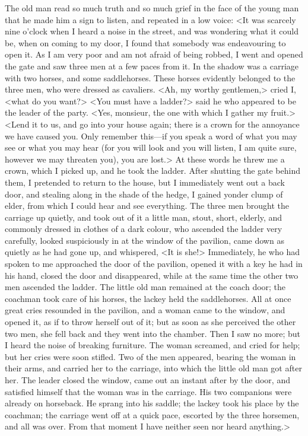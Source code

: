 The old man read so much truth and so much grief in the face of the young man that he made him a sign to listen, and repeated in a low voice: <It was scarcely nine o'clock when I heard a noise in the street, and was wondering what it could be, when on coming to my door, I found that somebody was endeavouring to open it. As I am very poor and am not afraid of being robbed, I went and opened the gate and saw three men at a few paces from it. In the shadow was a carriage with two horses, and some saddlehorses. These horses evidently belonged to the three men, who were dressed as cavaliers. <Ah, my worthy gentlemen,> cried I, <what do you want?> <You must have a ladder?> said he who appeared to be the leader of the party. <Yes, monsieur, the one with which I gather my fruit.> <Lend it to us, and go into your house again; there is a crown for the annoyance we have caused you. Only remember this---if you speak a word of what you may see or what you may hear (for you will look and you will listen, I am quite sure, however we may threaten you), you are lost.> At these words he threw me a crown, which I picked up, and he took the ladder. After shutting the gate behind them, I pretended to return to the house, but I immediately went out a back door, and stealing along in the shade of the hedge, I gained yonder clump of elder, from which I could hear and see everything. The three men brought the carriage up quietly, and took out of it a little man, stout, short, elderly, and commonly dressed in clothes of a dark colour, who ascended the ladder very carefully, looked suspiciously in at the window of the pavilion, came down as quietly as he had gone up, and whispered, <It is she!> Immediately, he who had spoken to me approached the door of the pavilion, opened it with a key he had in his hand, closed the door and disappeared, while at the same time the other two men ascended the ladder. The little old man remained at the coach door; the coachman took care of his horses, the lackey held the saddlehorses. All at once great cries resounded in the pavilion, and a woman came to the window, and opened it, as if to throw herself out of it; but as soon as she perceived the other two men, she fell back and they went into the chamber. Then I saw no more; but I heard the noise of breaking furniture. The woman screamed, and cried for help; but her cries were soon stifled. Two of the men appeared, bearing the woman in their arms, and carried her to the carriage, into which the little old man got after her. The leader closed the window, came out an instant after by the door, and satisfied himself that the woman was in the carriage. His two companions were already on horseback. He sprang into his saddle; the lackey took his place by the coachman; the carriage went off at a quick pace, escorted by the three horsemen, and all was over. From that moment I have neither seen nor heard anything.> 

